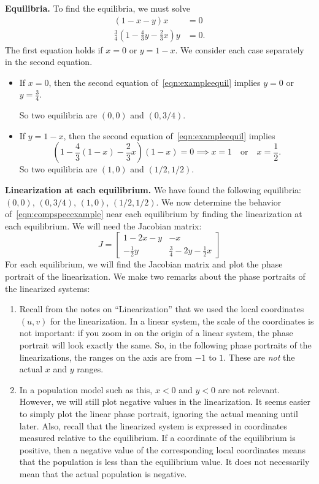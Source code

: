 \documentclass[reqno]{immbook}
\numberwithin{equation}{chapter}
\numberwithin{question}{section}
\numberwithin{theorem}{chapter}
\numberwithin{figure}{chapter}
\theoremstyle{definition}
\begin{document}
\noindent
\textbf{Equilibria.}
To find the equilibria, we must solve
\begin{equation}
\begin{split}
(1-x-y)x & = 0 \\
\frac{3}{4}\left(1 -\frac{4}{3}y - \frac{2}{3}x\right)y & = 0.
\end{split}
\label{eqn:exampleequil}
\end{equation}
The first equation holds if $x=0$ or $y = 1-x$.
We consider each case separately in the second equation.
\begin{itemize}
\item
If $x=0$, then the second equation of~\eqref{eqn:exampleequil} implies
$y=0$ or $y=\frac{3}{4}$.

So two equilibria are $(0,0)$ and $(0,3/4)$.
\item
If $y=1-x$, then the second equation
of~\eqref{eqn:exampleequil} implies
\begin{equation}
  \left(1-\frac{4}{3}(1-x) - \frac{2}{3}x\right)(1-x) = 0
  \implies x=1 \quad \textrm{or} \quad x=\frac{1}{2}.
\end{equation}
So two equilibria are $(1,0)$ and $(1/2,1/2)$.
\end{itemize}

\noindent
\textbf{Linearization at each equilibrium.}
We have found the following equilibria: $(0,0)$, $(0,3/4)$, $(1,0)$, $(1/2,1/2)$.
We now determine the behavior of~\eqref{eqn:compspecexample}
near each equilibrium by finding the linearization at each
equilibrium.
We will need the Jacobian matrix:
\begin{equation}
  J = \begin{bmatrix}
          1-2x-y & -x \\
	  -\frac{1}{2}y & \frac{3}{4}-2y-\frac{1}{2}x
      \end{bmatrix}
\end{equation}
For each equilibrium, we will find the Jacobian matrix
and plot the phase portrait of the linearization.
We make two remarks about the phase portraits of the linearized
systems:
\begin{enumerate}
\item
Recall from the notes on ``Linearization'' that we
used the local coordinates $(u,v)$ for the linearization.
In a linear system, the scale of the coordinates is not
important: if you zoom in on the origin of a linear system,
the phase portrait will look exactly the same.
So, in the following phase portraits of the linearizations,
the ranges on the axis are  from $-1$ to $1$.  These
are \emph{not} the actual $x$ and $y$ ranges.
\item
In a population model such as this, $x<0$ and $y<0$
are not relevant.  However, we will still plot negative
values in the linearization.  It seems easier to simply
plot the linear phase portrait, ignoring the actual
meaning until later.  Also, recall that the linearized
system is expressed in coordinates measured relative
to the equilibrium.  If a coordinate of the equilibrium
is positive, then a negative value of the corresponding
local coordinates means that the population is less than
the equilibrium value. It does not necessarily mean that
the actual population is negative.
\end{enumerate}
\end{document}
